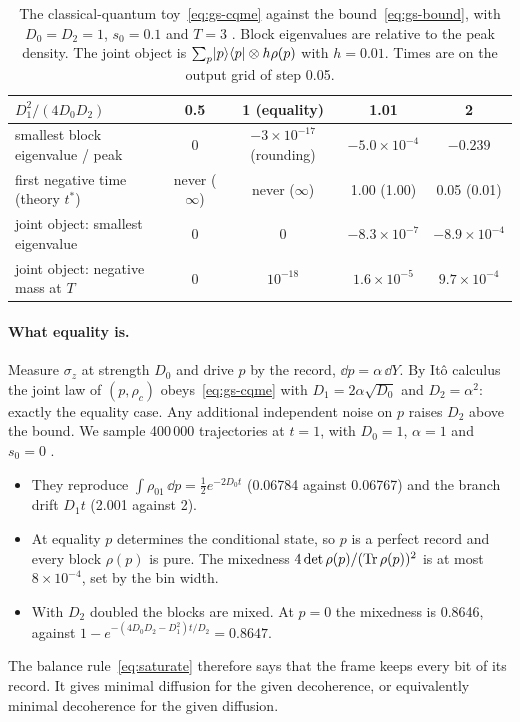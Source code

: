 \begin{table}[ht]\centering\small
\caption{The classical-quantum toy~\eqref{eq:gs-cqme} against the bound~\eqref{eq:gs-bound}, with $D_0=D_2=1$, $s_0=0.1$ and $T=3$
. Block eigenvalues are relative to the peak density. The joint object is $\sum_p\lvert p\rangle\langle p\rvert\otimes h\rho(p)$ with
$h=0.01$. Times are on the output grid of step 0.05.}\label{tab:gs-cq}
\begin{tabular}{@{}lcccc@{}}\toprule
$D_1^2/(4D_0D_2)$ & 0.5 & 1 (equality) & 1.01 & 2\\\midrule
smallest block eigenvalue / peak & $0$ & $-3\times10^{-17}$ (rounding) & $-5.0\times10^{-4}$ & $-0.239$\\
first negative time (theory $t^*$) & never ($\infty$) & never ($\infty$) & 1.00 (1.00) & 0.05 (0.01)\\
joint object: smallest eigenvalue & 0 & 0 & $-8.3\times10^{-7}$ & $-8.9\times10^{-4}$\\
joint object: negative mass at $T$ & 0 & $10^{-18}$ & $1.6\times10^{-5}$ & $9.7\times10^{-4}$\\\bottomrule
\end{tabular}
\end{table}

\paragraph{What equality is.} Measure $\sigma_z$ at strength $D_0$ and drive $p$ by the record, $\dd p=\alpha\,\dd Y$. By It\^o calculus the
joint law of $(p,\rho_c)$ obeys~\eqref{eq:gs-cqme} with $D_1=2\alpha\sqrt{D_0}$ and $D_2=\alpha^2$: exactly the equality case. Any additional
independent noise on $p$ raises $D_2$ above the bound. We sample 400\,000 trajectories at $t=1$, with $D_0=1$, $\alpha=1$ and $s_0=0$
.
\begin{itemize}[nosep]
\item They reproduce $\int\rho_{01}\,\dd p=\tfrac12e^{-2D_0t}$ (0.06784 against 0.06767) and the branch drift $D_1t$ (2.001 against 2).
\item At equality $p$ determines the conditional state, so $p$ is a perfect record and every block $\rho(p)$ is pure. The mixedness
$4\det\rho(p)/(\operatorname{Tr}\rho(p))^2$ is at most $8\times10^{-4}$, set by the bin width.
\item With $D_2$ doubled the blocks are mixed. At $p=0$ the mixedness is 0.8646, against $1-e^{-(4D_0D_2-D_1^2)t/D_2}=0.8647$.
\end{itemize}
The balance rule~\eqref{eq:saturate} therefore says that the frame keeps every bit of its record. It gives minimal diffusion for the given
decoherence, or equivalently minimal decoherence for the given diffusion.

